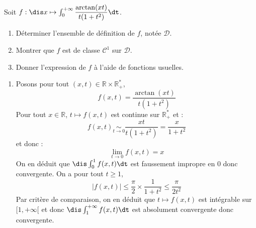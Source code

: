 \documentclass[a4paper,10pt]{report}
\begin{document}
\begin{Exercice}{} Soit $f : \dis x \mapsto \int_{0}^{+ \infty} \dfrac{\arctan(xt)}{t(1+t^2)} \dt$.
\begin{enumerate}
\item Déterminer l'ensemble de définition de $f$, notée $\mathcal{D}$.
\item Montrer que $f$ est de classe $\mathcal{C}^1$ sur $\mathcal{D}$.
\item Donner l'expression de $f$ à l'aide de fonctions usuelles.
\end{enumerate}
\end{Exercice}

\corr  
\begin{enumerate}
\item Posons pour tout $(x,t) \in \mathbb{R} \times \mathbb{R}_+^{*}$,
$$ f(x,t) = \dfrac{\arctan(xt)}{t(1+t^2)}$$
Pour tout $x \in \mathbb{R}$, $t \mapsto f(x,t)$ est continue sur $\mathbb{R}_+^{*}$ et :
$$ f(x,t) \underset{ t \rightarrow 0 }{\sim} \dfrac{xt}{t(1+t^2)} = \dfrac{x}{1+t^2}$$
et donc :
$$ \lim_{t \rightarrow 0 } f(x,t) = x$$
On en déduit que $\dis \int_{0}^1 f(x,t) \dt$ est faussement impropre en $0$ donc convergente. On a pour tout $t \geq 1$,
$$ \vert f(x,t) \vert \leq \dfrac{\pi}{2} \times \dfrac{1}{1+t^2} \leq \dfrac{\pi}{2t^2}$$
Par critère de comparaison, on en déduit que $t \mapsto f(x,t)$ est intégrable sur $[1,+ \infty[$ et donc $\dis \int_{1}^{+ \infty} f(x,t) \dt$ est absolument convergente donc convergente.

\medskip


\end{enumerate}
\end{document}
